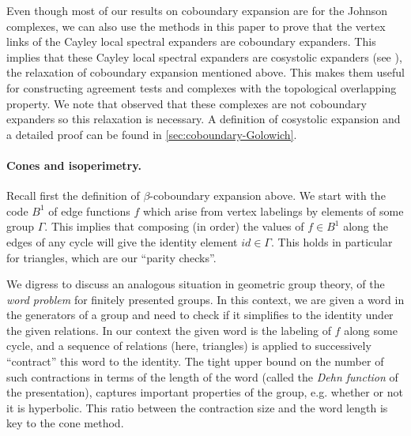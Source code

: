 \documentclass[10pt,a4paper]{article}
\newcommand{\prettyref}[1]{\cref{#1}}
\theoremstyle{definition}
\theoremstyle{remark}
\numberwithin{equation}{section}
\let\origparagraph\paragraph
\renewcommand{\paragraph}[1]{\origparagraph{#1.}}
\let\pref=\prettyref
\begin{document}
Even though most of our results on coboundary expansion are for the Johnson complexes, we can also use the methods in this paper to prove that the vertex links of the \cite{Golowich2023} Cayley local spectral expanders are coboundary expanders. This implies that these Cayley local spectral expanders are cosystolic expanders (see \cite{KaufmanKL2016,DiksteinD2023cbdry}), the relaxation of coboundary expansion mentioned above. This makes them useful for constructing agreement tests and complexes with the topological overlapping property. We note that \cite{Golowich2023} observed that these complexes are not coboundary expanders so this relaxation is necessary. A definition of cosystolic expansion and a detailed proof can be found in \pref{sec:coboundary-Golowich}.

\paragraph{Cones and isoperimetry}
Recall first the definition of $\beta$-coboundary expansion above. We start with the code \(B^1\) of edge functions $f$ which arise from vertex labelings by elements of some group $\Gamma$. This implies that composing (in order) the values of $f\in B^1$ along the edges of any cycle will give the identity element $id \in \Gamma$. This holds in particular for triangles, which are our ``parity checks''.

We digress to discuss an analogous situation in geometric group theory, of the \emph{word problem} for finitely presented groups. In this context, we are given a word in the generators of a group and need to check if it simplifies to the identity under the given relations. In our context the given word is the labeling of $f$ along some cycle, and a sequence of relations (here, triangles) is applied to successively ``contract'' this word to the identity. The tight upper bound on the number of such contractions in terms of the length of the word (called the \emph{Dehn function} of the presentation), captures important properties of the group, e.g. whether or not it is hyperbolic. This ratio between the contraction size and the word length is key to the cone method. 
\end{document}
